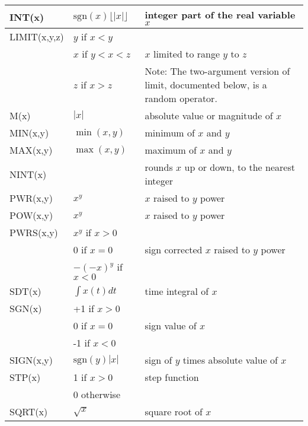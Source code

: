 {\begin{longtable}{>{\raggedright\small}m{2.0in}>{\raggedright\small}m{1.0in}>{\raggedright\let\\\tabularnewline\small}m{2.2in}}
    INT(x) & $\mathrm{sgn}(x)\lfloor |x|\rfloor$ & integer part of the real 
    variable $x$  \\ \hline

    LIMIT(x,y,z)
    & $y$ if $x < y$ & \\
    & $x$ if $y < x < z$  & $x$ limited to range $y$ to $z$ \\
    & $z$ if $x > z$ & Note: The two-argument version of limit, documented below, is a random operator. \\ \hline
    
    M(x) & $|x|$ & absolute value or magnitude of $x$ \\ \hline

    MIN(x,y) & $\min(x,y)$ & minimum of $x$ and $y$  \\ \hline

    MAX(x,y) & $\max(x,y)$ & maximum of $x$ and $y$  \\ \hline

    NINT(x) &            & rounds $x$ up or down, to the nearest integer  \\ \hline

    PWR(x,y) & $x^{y}$ & $x$ raised to $y$ power  \\ \hline
    POW(x,y) & $x^{y}$ & $x$ raised to $y$ power  \\ \hline
    PWRS(x,y)
    & $x^{y}$ if $x > 0$ & \\
    & 0 if $x = 0$ & sign corrected $x$ raised to $y$ power  \\
    & $-(-x)^{y}$ if $x < 0$ & \\ \hline

    SDT(x)
    & $\int x(t)  dt$ & time integral of $x$ \\ \hline
    
    SGN(x)
    & +1 if $x > 0$ & \\
    & 0 if $x = 0$  & sign value of $x$\\
    & -1 if $x < 0$ & \\ \hline

    SIGN(x,y) & $\mathrm{sgn}(y)|x|$ & sign of $y$ times absolute value of $x$
    \\ \hline

    STP(x)
    & 1 if $x > 0$ & step function \\
    & 0 otherwise &                                      \\ \hline

    SQRT(x) & $\sqrt{x}$ & square root of $x$ \\ \hline


\end{longtable}}
